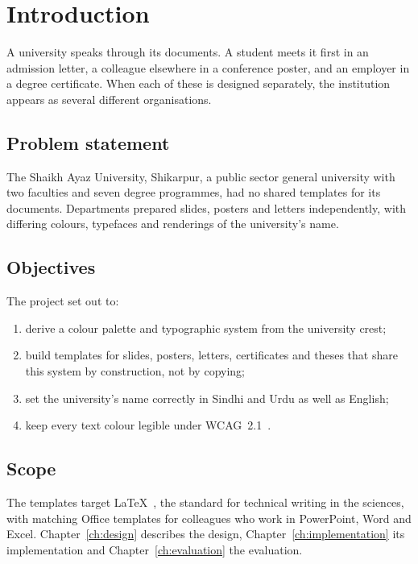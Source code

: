 \documentclass[degree=bs,bib=ieee]{saus-thesis}
\begin{document}
\chapter{Introduction}\label{ch:intro}

A university speaks through its documents. A student meets it first in an
admission letter, a colleague elsewhere in a conference poster, and an employer
in a degree certificate. When each of these is designed separately, the
institution appears as several different organisations.

\section{Problem statement}

The Shaikh Ayaz University, Shikarpur, a public sector general university with
two faculties and seven degree programmes, had no shared templates for its
documents. Departments prepared slides, posters and letters independently, with
differing colours, typefaces and renderings of the university's name.

\section{Objectives}

The project set out to:
\begin{enumerate}
  \item derive a colour palette and typographic system from the university crest;
  \item build templates for slides, posters, letters, certificates and theses
        that share this system by construction, not by copying;
  \item set the university's name correctly in Sindhi and Urdu as well as English;
  \item keep every text colour legible under WCAG~2.1~\cite{wcag21}.
\end{enumerate}

\section{Scope}

The templates target \LaTeX{}~\cite{lamport1994}, the standard for technical
writing in the sciences, with matching Office templates for colleagues who
work in PowerPoint, Word and Excel. Chapter~\ref{ch:design} describes the
design, Chapter~\ref{ch:implementation} its implementation and
Chapter~\ref{ch:evaluation} the evaluation.
\end{document}
